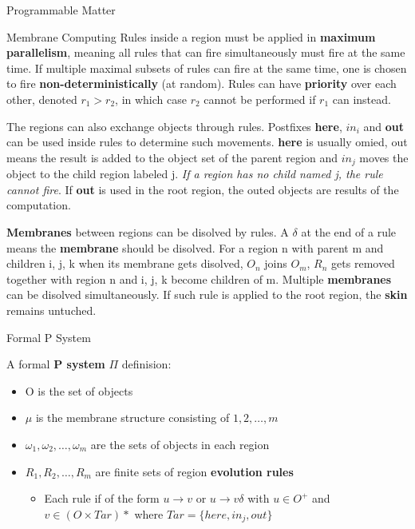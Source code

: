 \documentclass[12pt, letterpaper]{article}
\begin{document}
\begin{section}{Programmable Matter}
\begin{subsection}{Membrane Computing}
    Rules inside a region must be applied in \textbf{maximum parallelism},
    meaning all rules that can fire simultaneously must fire at the same time.
    If multiple maximal subsets of rules can fire at the same time, one is
    chosen to fire \textbf{non-deterministically} (at random). Rules can have
    \textbf{priority} over each other, denoted \(r_{1} > r_{2}\), in which case
    \(r_{2}\) cannot be performed if \(r_{1}\) can instead.

    The regions can also exchange objects through rules. Postfixes
    \textbf{here}, \textbf{\(in_{i}\)} and \textbf{out} can be used inside
    rules to determine such movements. \textbf{here} is usually omied, out
    means the result is added to the object set of the parent region and
    \(in_{j}\) moves the object to the child region labeled j. \textit{If a
      region has no child named j, the rule cannot fire}. If \textbf{out} is
    used in the root region, the outed objects are results of the
    computation.

    \textbf{Membranes} between regions can be disolved by rules. A \(\delta\)
    at the end of a rule means the \textbf{membrane} should be disolved. For a
    region n with parent m and children i, j, k when its membrane gets
    disolved, \(O_{n}\) joins \(O_{m}\), \(R_{n}\) gets removed together with
    region n and i, j, k become children of m. Multiple \textbf{membranes} can
    be disolved simultaneously. If such rule is applied to the root region,
    the \textbf{skin} remains untuched.

    \begin{subsubsection}{Formal P System}

      A formal \textbf{P system} \(\Pi\) definision:
      \begin{itemize}
        \item O is the set of objects
        \item \(\mu\) is the membrane structure consisting of
              \(1, 2, \dots , m\)
        \item \(\omega_{1}, \omega_{2}, \dots , \omega_{m}\) are the sets of
              objects in each region
        \item \(R_{1}, R_{2}, \dots , R_{m}\) are finite sets of region
              \textbf{evolution rules}
              \begin{itemize}
                \item Each rule if of the form \(u \to v\) or \(u \to v
                      \delta\) with \(u \in O^{+}\) and \(v \in
                      (O \times Tar)*\) where \(Tar = \{ here, in_{j}, out \}\)
              \end{itemize}
      \end{itemize}


\end{subsubsection}
\end{subsection}
\end{section}
\end{document}
